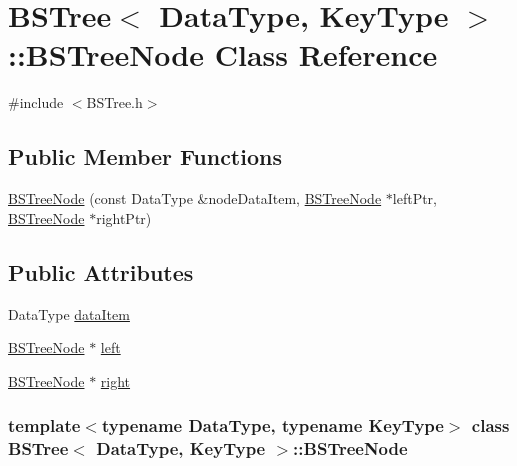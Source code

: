\hypertarget{class_b_s_tree_1_1_b_s_tree_node}{\section{\-B\-S\-Tree$<$ \-Data\-Type, \-Key\-Type $>$\-:\-:\-B\-S\-Tree\-Node \-Class \-Reference}
\label{class_b_s_tree_1_1_b_s_tree_node}
}


{\ttfamily \#include $<$\-B\-S\-Tree.\-h$>$}

\subsection*{\-Public \-Member \-Functions}
\begin{DoxyCompactItemize}
\item 
\hyperlink{class_b_s_tree_1_1_b_s_tree_node_a40f0e1ccea243f6d47b5c1b0a2913ff8}{\-B\-S\-Tree\-Node} (const \-Data\-Type \&node\-Data\-Item, \hyperlink{class_b_s_tree_1_1_b_s_tree_node}{\-B\-S\-Tree\-Node} $\ast$left\-Ptr, \hyperlink{class_b_s_tree_1_1_b_s_tree_node}{\-B\-S\-Tree\-Node} $\ast$right\-Ptr)
\end{DoxyCompactItemize}
\subsection*{\-Public \-Attributes}
\begin{DoxyCompactItemize}
\item 
\-Data\-Type \hyperlink{class_b_s_tree_1_1_b_s_tree_node_a507c8d6dde1b8d35d9af6b4e78f38962}{data\-Item}
\item 
\hyperlink{class_b_s_tree_1_1_b_s_tree_node}{\-B\-S\-Tree\-Node} $\ast$ \hyperlink{class_b_s_tree_1_1_b_s_tree_node_a7a90150dd249432e240dc363955c5ca1}{left}
\item 
\hyperlink{class_b_s_tree_1_1_b_s_tree_node}{\-B\-S\-Tree\-Node} $\ast$ \hyperlink{class_b_s_tree_1_1_b_s_tree_node_abcc00fc20d8591933c476b6bcdfdab17}{right}
\end{DoxyCompactItemize}
\subsubsection*{template$<$typename \-Data\-Type, typename \-Key\-Type$>$ class B\-S\-Tree$<$ Data\-Type, Key\-Type $>$\-::\-B\-S\-Tree\-Node}



